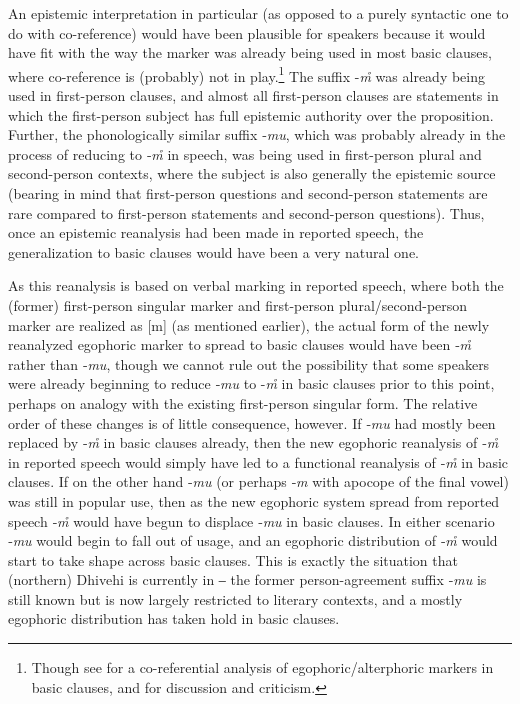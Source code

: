 \documentclass[output=paper]{langsci/langscibook}
\begin{document}
An epistemic interpretation in particular (as opposed to a purely syntactic one to do with co-reference) would have been plausible for speakers because it would have fit with the way the marker was already being used in most basic clauses, where co-reference is (probably) not in play.\footnote{Though see \cite{Hale1980} for a co-referential analysis of egophoric/alterphoric markers in basic clauses, and \cite[51–54]{SanRoque2018} for discussion and criticism.} 
The suffix -\textit{m̊} was already being used in first-person clauses, and almost all first-person clauses are statements in which the first-person subject has full epistemic authority over the proposition. Further, the phonologically similar suffix ‑\textit{mu}, which was probably already in the process of reducing to ‑\textit{m̊} in speech, was being used in first-person plural and second-person contexts, where the subject is also generally the epistemic source (bearing in mind that first-person questions and second-person statements are rare compared to first-person statements and second-person questions). Thus, once an epistemic reanalysis had been made in reported speech, the generalization to basic clauses would have been a very natural one. 

As this reanalysis is based on verbal marking in reported speech, where both the (former) first-person singular marker and first-person plural/second-person marker are realized as [m] (as mentioned earlier), the actual form of the newly reanalyzed egophoric marker to spread to basic clauses would have been ‑\textit{m̊} rather than ‑\textit{mu}, though we cannot rule out the possibility that some speakers were already beginning to reduce ‑\textit{mu} to -\textit{m̊} in basic clauses prior to this point, perhaps on analogy with the existing first-person singular form. The relative order of these changes is of little consequence, however. If ‑\textit{mu} had mostly been replaced by ‑\textit{m̊} in basic clauses already, then the new egophoric reanalysis of ‑\textit{m̊} in reported speech would simply have led to a functional reanalysis of ‑\textit{m̊} in basic clauses. If on the other hand ‑\textit{mu} (or perhaps ‑\textit{m} with apocope of the final vowel) was still in popular use, then as the new egophoric system spread from reported speech ‑\textit{m̊} would have begun to displace ‑\textit{mu} in basic clauses. In either scenario ‑\textit{mu} would begin to fall out of usage, and an egophoric distribution of ‑\textit{m̊} would start to take shape across basic clauses. This is exactly the situation that (northern) Dhivehi is currently in ‒ the former person-agreement suffix ‑\textit{mu} is still known but is now largely restricted to literary contexts, and a mostly egophoric distribution has taken hold in basic clauses. 
\end{document}
